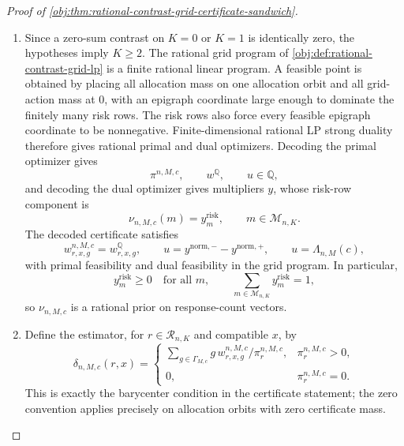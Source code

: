 \documentclass[11pt]{article}
\begin{document}
\begin{proof}[Proof of \cref{obj:thm:rational-contrast-grid-certificate-sandwich}]
\begin{enumerate}
\item Since a zero-sum contrast on \(K=0\) or \(K=1\) is identically zero, the hypotheses imply \(K\geq2\).  The rational grid program of \cref{obj:def:rational-contrast-grid-lp} is a finite rational linear program.  A feasible point is obtained by placing all allocation mass on one allocation orbit and all grid-action mass at \(0\), with an epigraph coordinate large enough to dominate the finitely many risk rows.  The risk rows also force every feasible epigraph coordinate to be nonnegative.  Finite-dimensional rational LP strong duality therefore gives rational primal and dual optimizers.  Decoding the primal optimizer gives
\[
\pi^{n,M,c},\qquad w^{\mathbb Q},\qquad u\in\mathbb Q,
\]
and decoding the dual optimizer gives multipliers \(y\), whose risk-row component is
\[
\nu_{n,M,c}(m)=y_m^{\mathrm{risk}},
\qquad m\in\mathcal M_{n,K}.
\]
The decoded certificate satisfies
\[
w^{n,M,c}_{r,x,g}=w^{\mathbb Q}_{r,x,g},
\qquad
u=y^{\mathrm{norm},-}-y^{\mathrm{norm},+},
\qquad
u=\Lambda_{n,M}(c),
\]
with primal feasibility and dual feasibility in the grid program.  In particular,
\[
y_m^{\mathrm{risk}}\geq0
\quad\text{for all }m,
\qquad
\sum_{m\in\mathcal M_{n,K}}y_m^{\mathrm{risk}}=1,
\]
so \(\nu_{n,M,c}\) is a rational prior on response-count vectors. %

\item Define the estimator, for \(r\in\mathcal R_{n,K}\) and compatible \(x\), by
\[
\delta_{n,M,c}(r,x)=
\begin{cases}
\displaystyle
\sum_{g\in\Gamma_{M,c}} g\,w_{r,x,g}^{n,M,c}/\pi_r^{n,M,c},
& \pi_r^{n,M,c}>0,\\[0.7em]
0,& \pi_r^{n,M,c}=0.
\end{cases}
\]
This is exactly the barycenter condition in the certificate statement; the zero convention applies precisely on allocation orbits with zero certificate mass. %


\end{enumerate}
\end{proof}
\end{document}
